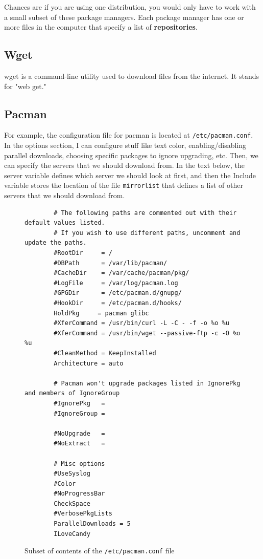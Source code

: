   Chances are if you are using one distribution, you would only have to work with a small subset of these package managers. Each package manager has one or more files in the computer that specify a list of \textbf{repositories}. 

  \subsection{Wget}

    wget is a command-line utility used to download files from the internet. It stands for "web get." 

  \subsection{Pacman}

    For example, the configuration file for pacman is located at \texttt{/etc/pacman.conf}. In the options section, I can configure stuff like text color, enabling/disabling parallel downloads, choosing specific packages to ignore upgrading, etc. Then, we can specify the servers that we should download from. In the text below, the server variable defines which server we should look at first, and then the Include variable stores the location of the file \texttt{mirrorlist} that defines a list of other servers that we should download from. 
    
    \begin{figure}
      \begin{lstlisting} 
        # The following paths are commented out with their default values listed.
        # If you wish to use different paths, uncomment and update the paths.
        #RootDir     = /
        #DBPath      = /var/lib/pacman/
        #CacheDir    = /var/cache/pacman/pkg/
        #LogFile     = /var/log/pacman.log
        #GPGDir      = /etc/pacman.d/gnupg/
        #HookDir     = /etc/pacman.d/hooks/
        HoldPkg     = pacman glibc
        #XferCommand = /usr/bin/curl -L -C - -f -o %o %u
        #XferCommand = /usr/bin/wget --passive-ftp -c -O %o %u
        #CleanMethod = KeepInstalled
        Architecture = auto

        # Pacman won't upgrade packages listed in IgnorePkg and members of IgnoreGroup
        #IgnorePkg   =
        #IgnoreGroup =

        #NoUpgrade   =
        #NoExtract   =

        # Misc options
        #UseSyslog
        #Color
        #NoProgressBar
        CheckSpace
        #VerbosePkgLists
        ParallelDownloads = 5
        ILoveCandy

      \end{lstlisting}
      \caption{Subset of contents of the \texttt{/etc/pacman.conf} file} \label{fig:pacman.conf}
    \end{figure}
    
